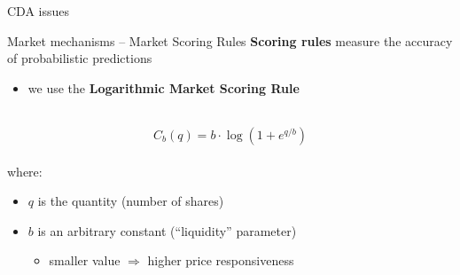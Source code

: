 \documentclass[9pt]{beamer}
\begin{document}
\begin{frame}{CDA issues}
    ~\\
    
\end{frame}
    
\begin{frame}{Market mechanisms -- Market Scoring Rules}
    \textbf{Scoring rules} measure the accuracy of probabilistic predictions
    \begin{itemize}
        \item we use the \textbf{Logarithmic Market Scoring Rule}~\cite{LMSR}
    \end{itemize}~\\
    
    \begin{equation}
        C_b (q) = b \cdot \log (1+e^{q/b})
    \end{equation}~\\
    
    where:
    \begin{itemize}
        \item $q$ is the quantity (number of shares)
        \item  $b$ is an arbitrary constant (``liquidity'' parameter)
        \begin{itemize}
            \item smaller value $\Rightarrow$ higher price responsiveness
        \end{itemize}
    \end{itemize}
\end{frame}
\end{document}

